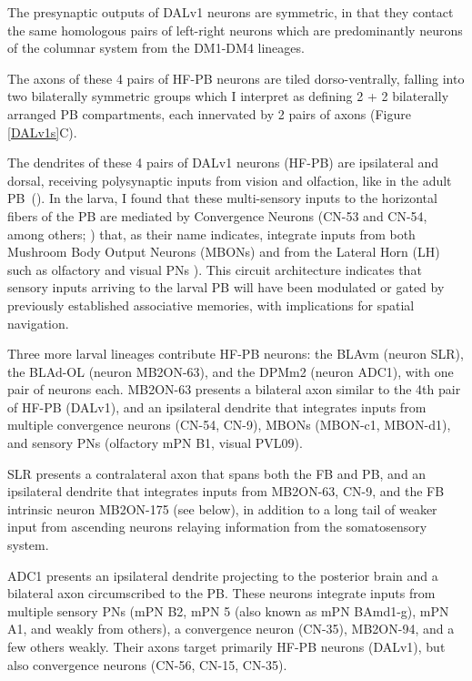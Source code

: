 
    The presynaptic outputs of DALv1 neurons are symmetric, in that they contact the same homologous pairs of left-right neurons which are predominantly neurons of the columnar system from the DM1-DM4 lineages.

    The axons of these 4 pairs of HF-PB neurons are tiled dorso-ventrally, falling into two bilaterally symmetric groups which I interpret as defining 2 + 2 bilaterally arranged PB compartments, each innervated by 2 pairs of axons (Figure \ref{DALv1s}C). 

    The dendrites of these 4 pairs of DALv1 neurons (HF-PB) are ipsilateral and dorsal, receiving polysynaptic inputs from vision and olfaction, like in the adult PB~(\citep{hulse2021connectome}). In the larva, I found that these multi-sensory inputs to the horizontal fibers of the PB are mediated by Convergence Neurons (CN-53 and CN-54, among others; \citep{eschbach2021circuits}) that, as their name indicates, integrate inputs from both Mushroom Body Output Neurons (MBONs) and from the Lateral Horn (LH) such as olfactory and visual PNs \citep{eschbach2020recurrent}). This circuit architecture indicates that sensory inputs arriving to the larval PB will have been modulated or gated by previously established associative memories, with implications for spatial navigation.

    Three more larval lineages contribute HF-PB neurons: the BLAvm (neuron SLR), the BLAd-OL (neuron MB2ON-63), and the DPMm2 (neuron ADC1),  with one pair of neurons each. 
    MB2ON-63 presents a bilateral axon similar to the 4th pair of HF-PB (DALv1), and an ipsilateral dendrite that integrates inputs from multiple convergence neurons (CN-54, CN-9), MBONs (MBON-c1, MBON-d1), and sensory PNs (olfactory mPN B1, visual PVL09).

    SLR presents a contralateral axon that spans both the FB and PB, and an ipsilateral dendrite that integrates inputs from MB2ON-63, CN-9, and the FB intrinsic neuron MB2ON-175 (see below), in addition to a long tail of weaker input from ascending neurons relaying information from the somatosensory system.

    ADC1 presents an ipsilateral dendrite projecting to the posterior brain and a bilateral axon circumscribed to the PB. These neurons integrate inputs from multiple sensory PNs (mPN B2, mPN 5 (also known as mPN BAmd1-g), mPN A1, and weakly from others), a convergence neuron (CN-35), MB2ON-94, and a few others weakly. Their axons target primarily HF-PB neurons (DALv1), but also convergence neurons  (CN-56, CN-15, CN-35).
 
